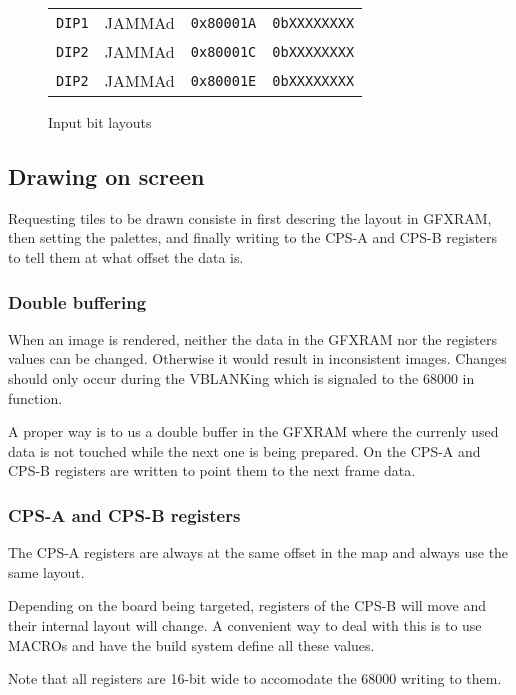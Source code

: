 \begin{figure}[H]
\begin{tabularx}{\textwidth}{Xllr}
    \toprule   
    \texttt{DIP1} & JAMMAd &  \texttt{0x80001A}    &  \texttt{0bXXXXXXXX}    \\      
    \texttt{DIP2} & JAMMAd &  \texttt{0x80001C}    &  \texttt{0bXXXXXXXX}    \\      
    \texttt{DIP2} & JAMMAd &  \texttt{0x80001E}    &  \texttt{0bXXXXXXXX}    \\      
  \toprule   
\end{tabularx}
\caption*{Input bit layouts}
\end{figure}

\subsection{Drawing on screen}
Requesting tiles to be drawn consiste in first descring the layout in GFXRAM, then setting the palettes, and finally writing to the CPS-A and CPS-B registers to tell them at what offset the data is.

\subsubsection{Double buffering}
When an image is rendered, neither the data in the GFXRAM nor the registers values can be changed. Otherwise it would result in inconsistent images. Changes should only occur during the VBLANKing which is signaled to the 68000 in  function.

A proper way is to us a double buffer in the GFXRAM where the currenly used data is not touched while the next one is being prepared. On  the CPS-A and CPS-B registers are written to point them to the next frame data.

\subsubsection{CPS-A and CPS-B registers}
The CPS-A registers are always at the same offset in the map and always use the same layout. 

Depending on the board being targeted, registers of the CPS-B will move and their internal layout will change. A convenient way to deal with this is to use MACROs and have the build system define all these values.

Note that all registers are 16-bit wide to accomodate the 68000 writing to them.

